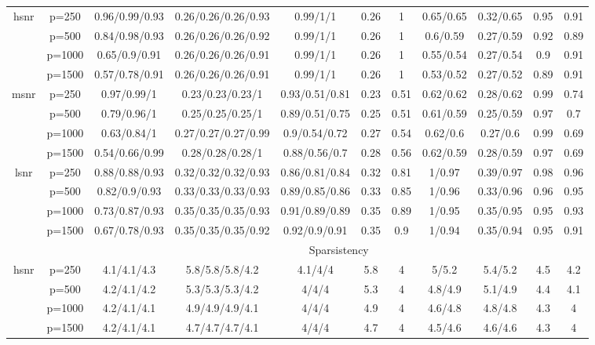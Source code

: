 \begin{table}[ht]
{\begin{tabular}{|c|c|ccccccccc|}
\midrule\multirow{4}[2]{*}{hsnr} & p=250 & 0.96/0.99/0.93 & 0.26/0.26/0.26/0.93 & 0.99/1/1 & 0.26 & 1 & 0.65/0.65 & 0.32/0.65 & 0.95 & 0.91 \\ 
   & p=500 & 0.84/0.98/0.93 & 0.26/0.26/0.26/0.92 & 0.99/1/1 & 0.26 & 1 & 0.6/0.59 & 0.27/0.59 & 0.92 & 0.89 \\ 
   & p=1000 & 0.65/0.9/0.91 & 0.26/0.26/0.26/0.91 & 0.99/1/1 & 0.26 & 1 & 0.55/0.54 & 0.27/0.54 & 0.9 & 0.91 \\ 
   & p=1500 & 0.57/0.78/0.91 & 0.26/0.26/0.26/0.91 & 0.99/1/1 & 0.26 & 1 & 0.53/0.52 & 0.27/0.52 & 0.89 & 0.91 \\ 
  \midrule\multirow{4}[2]{*}{msnr} & p=250 & 0.97/0.99/1 & 0.23/0.23/0.23/1 & 0.93/0.51/0.81 & 0.23 & 0.51 & 0.62/0.62 & 0.28/0.62 & 0.99 & 0.74 \\ 
   & p=500 & 0.79/0.96/1 & 0.25/0.25/0.25/1 & 0.89/0.51/0.75 & 0.25 & 0.51 & 0.61/0.59 & 0.25/0.59 & 0.97 & 0.7 \\ 
   & p=1000 & 0.63/0.84/1 & 0.27/0.27/0.27/0.99 & 0.9/0.54/0.72 & 0.27 & 0.54 & 0.62/0.6 & 0.27/0.6 & 0.99 & 0.69 \\ 
   & p=1500 & 0.54/0.66/0.99 & 0.28/0.28/0.28/1 & 0.88/0.56/0.7 & 0.28 & 0.56 & 0.62/0.59 & 0.28/0.59 & 0.97 & 0.69 \\ 
  \midrule\multirow{4}[2]{*}{lsnr} & p=250 & 0.88/0.88/0.93 & 0.32/0.32/0.32/0.93 & 0.86/0.81/0.84 & 0.32 & 0.81 & 1/0.97 & 0.39/0.97 & 0.98 & 0.96 \\ 
   & p=500 & 0.82/0.9/0.93 & 0.33/0.33/0.33/0.93 & 0.89/0.85/0.86 & 0.33 & 0.85 & 1/0.96 & 0.33/0.96 & 0.96 & 0.95 \\ 
   & p=1000 & 0.73/0.87/0.93 & 0.35/0.35/0.35/0.93 & 0.91/0.89/0.89 & 0.35 & 0.89 & 1/0.95 & 0.35/0.95 & 0.95 & 0.93 \\ 
   & p=1500 & 0.67/0.78/0.93 & 0.35/0.35/0.35/0.92 & 0.92/0.9/0.91 & 0.35 & 0.9 & 1/0.94 & 0.35/0.94 & 0.95 & 0.91 \\ 
   \midrule 
 \multicolumn{1}{|c}{} &       & \multicolumn{9}{c|}{Sparsistency} \\
\midrule\multirow{4}[2]{*}{hsnr} & p=250 & 4.1/4.1/4.3 & 5.8/5.8/5.8/4.2 & 4.1/4/4 & 5.8 & 4 & 5/5.2 & 5.4/5.2 & 4.5 & 4.2 \\ 
   & p=500 & 4.2/4.1/4.2 & 5.3/5.3/5.3/4.2 & 4/4/4 & 5.3 & 4 & 4.8/4.9 & 5.1/4.9 & 4.4 & 4.1 \\ 
   & p=1000 & 4.2/4.1/4.1 & 4.9/4.9/4.9/4.1 & 4/4/4 & 4.9 & 4 & 4.6/4.8 & 4.8/4.8 & 4.3 & 4 \\ 
   & p=1500 & 4.2/4.1/4.1 & 4.7/4.7/4.7/4.1 & 4/4/4 & 4.7 & 4 & 4.5/4.6 & 4.6/4.6 & 4.3 & 4 \\ 

\end{tabular}}
\end{table}
